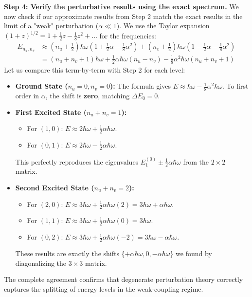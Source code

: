 \begin{solution}
\textbf{Step 4: Verify the perturbative results using the exact spectrum.}
We now check if our approximate results from Step 2 match the exact results in the limit of a "weak" perturbation ($\alpha \ll 1$). We use the Taylor expansion $(1+z)^{1/2} = 1 + \frac{1}{2}z - \frac{1}{8}z^2 + \dots$ for the frequencies:
\begin{align*}
    E_{n_u, n_v} &\approx \left( n_u + \frac{1}{2} \right) \hbar\omega \left( 1 + \frac{1}{2}\alpha - \frac{1}{8}\alpha^2 \right) + \left( n_v + \frac{1}{2} \right) \hbar\omega \left( 1 - \frac{1}{2}\alpha - \frac{1}{8}\alpha^2 \right) \\
    &= (n_u + n_v + 1)\hbar\omega + \frac{1}{2}\alpha\hbar\omega(n_u - n_v) - \frac{1}{8}\alpha^2\hbar\omega(n_u + n_v + 1)
\end{align*}
Let us compare this term-by-term with Step 2 for each level:
\begin{itemize}
    \item \textbf{Ground State ($n_u=0, n_v=0$):} The formula gives $E \approx \hbar\omega - \frac{1}{8}\alpha^2\hbar\omega$. To first order in $\alpha$, the shift is \textbf{zero}, matching $\Delta E_0 = 0$.
    \item \textbf{First Excited State ($n_u+n_v=1$):}
    \begin{itemize}
        \item For $(1, 0)$: $E \approx 2\hbar\omega + \frac{1}{2}\alpha\hbar\omega$.
        \item For $(0, 1)$: $E \approx 2\hbar\omega - \frac{1}{2}\alpha\hbar\omega$.
    \end{itemize}
    This perfectly reproduces the eigenvalues $E_1^{(0)} \pm \frac{1}{2}\alpha\hbar\omega$ from the $2 \times 2$ matrix.
    \item \textbf{Second Excited State ($n_u+n_v=2$):}
    \begin{itemize}
        \item For $(2, 0)$: $E \approx 3\hbar\omega + \frac{1}{2}\alpha\hbar\omega(2) = 3\hbar\omega + \alpha\hbar\omega$.
        \item For $(1, 1)$: $E \approx 3\hbar\omega + \frac{1}{2}\alpha\hbar\omega(0) = 3\hbar\omega$.
        \item For $(0, 2)$: $E \approx 3\hbar\omega + \frac{1}{2}\alpha\hbar\omega(-2) = 3\hbar\omega - \alpha\hbar\omega$.
    \end{itemize}
    These results are exactly the shifts $\{+\alpha\hbar\omega, 0, -\alpha\hbar\omega\}$ we found by diagonalizing the $3 \times 3$ matrix.
\end{itemize}
The complete agreement confirms that degenerate perturbation theory correctly captures the splitting of energy levels in the weak-coupling regime.

\end{solution}

